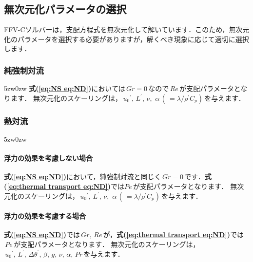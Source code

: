 \subsection{無次元化パラメータの選択}
FFV-Cソルバーは，支配方程式を無次元化して解いています．このため，無次元化のパラメータを選択する必要がありますが，解くべき現象に応じて適切に選択します．


\subsubsection{純強制対流}
\begin{indentation}{5zw}{0zw}
\noindent \textbf{式(\ref{eq:NS eq:ND})}においては$\,Gr=0\,$なので$\,Re\,$が支配パラメータとなります．
無次元化のスケーリングは，$\,{u_{0}}^{\prime},\,L^{\prime},\,\nu,\,\,\alpha\,(\,=\lambda / \rho^{\prime} C_{p})\,$を与えます．\\

\end{indentation}

\subsubsection{熱対流}
\begin{indentation}{5zw}{0zw}
\paragraph{浮力の効果を考慮しない場合}
\noindent \textbf{式(\ref{eq:NS eq:ND})}において，純強制対流と同じく$\,Gr=0\,$です．\textbf{式(\ref{eq:thermal transport eq:ND})}では$Pe\,$が支配パラメータとなります．
無次元化のスケーリングは，$\,{u_{0}}^{\prime},\,L^{\prime},\,\nu,\,\,\alpha\,(\,=\lambda / \rho^{\prime} C_{p})\,$を与えます．\\
\paragraph{浮力の効果を考慮する場合}
\textbf{式(\ref{eq:NS eq:ND})}では$\,Gr,\,Re\,$が，\textbf{式(\ref{eq:thermal transport eq:ND})}では$\,Pe\,$が支配パラメータとなります．
無次元化のスケーリングは，$\,{u_{0}}^{\prime},\,L^{\prime},\,\Delta\theta^{\prime},\,\beta,\,g,\,\nu,\,\alpha,\,Pr\,$を与えます．\\
\end{indentation}

